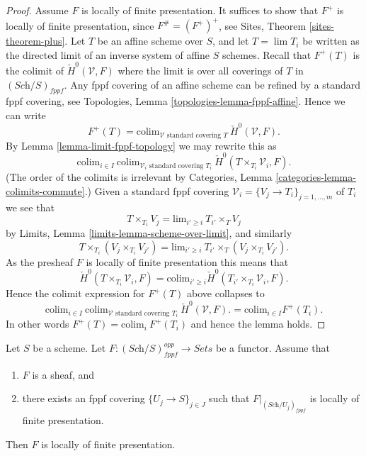 \begin{proof}
Assume $F$ is locally of finite presentation.
It suffices to show that $F^+$ is locally of finite presentation, since
$F^\# = (F^+)^+$, see
Sites, Theorem \ref{sites-theorem-plus}.
Let $T$ be an affine scheme over $S$, and let $T = \lim T_i$ be written
as the directed limit of an inverse system of affine $S$ schemes.
Recall that $F^+(T)$ is the colimit of $\check H^0(\mathcal{V}, F)$
where the limit is over all coverings of $T$ in $(\textit{Sch}/S)_{fppf}$.
Any fppf covering of an affine scheme can be refined by a standard
fppf covering, see
Topologies, Lemma \ref{topologies-lemma-fppf-affine}.
Hence we can write
$$
F^+(T)
=
\text{colim}_{\mathcal{V}\text{ standard covering }T}\ 
\check H^0(\mathcal{V}, F).
$$
By
Lemma \ref{lemma-limit-fppf-topology}
we may rewrite this as
$$
\text{colim}_{i \in I}\ 
\text{colim}_{\mathcal{V}_i\text{ standard covering }T_i}\ 
\check H^0(T \times_{T_i}\mathcal{V}_i, F).
$$
(The order of the colimits is irrelevant by
Categories, Lemma \ref{categories-lemma-colimits-commute}.)
Given a standard fppf covering
$\mathcal{V}_i = \{V_j \to T_i\}_{j = 1, \ldots, m}$ of $T_i$ we see that
$$
T \times_{T_i} V_j = \text{lim}_{i' \geq i}\ T_{i'} \times_T V_j
$$
by 
Limits, Lemma \ref{limits-lemma-scheme-over-limit}, and similarly
$$
T \times_{T_i} (V_j \times_{T_i} V_{j'}) =
\text{lim}_{i' \geq i}\ T_{i'} \times_T (V_j \times_{T_i} V_{j'}).
$$
As the presheaf $F$ is locally of finite presentation this means that
$$
\check H^0(T \times_{T_i}\mathcal{V}_i, F)
=
\text{colim}_{i' \geq i}
\check H^0(T_{i'} \times_{T_i}\mathcal{V}_i, F).
$$
Hence the colimit expression for $F^+(T)$ above collapses to
$$
\text{colim}_{i \in I}\ 
\text{colim}_{\mathcal{V}\text{ standard covering }T_i}\ 
\check H^0(\mathcal{V}, F).
=
\text{colim}_{i \in I} F^+(T_i).
$$
In other words $F^+(T) = \text{colim}_i\ F^+(T_i)$ and hence
the lemma holds.
\end{proof}

\begin{lemma}
\label{lemma-sheaf-finite-presentation}
Let $S$ be a scheme. 
Let $F : (\textit{Sch}/S)_{fppf}^{opp} \to \textit{Sets}$ be a functor.
Assume that
\begin{enumerate}
\item $F$ is a sheaf, and
\item there exists an fppf covering $\{U_j \to S\}_{j \in J}$ such that
$F|_{(\textit{Sch}/U_j)_{fppf}}$ is locally of finite presentation.
\end{enumerate}
Then $F$ is locally of finite presentation.
\end{lemma}

